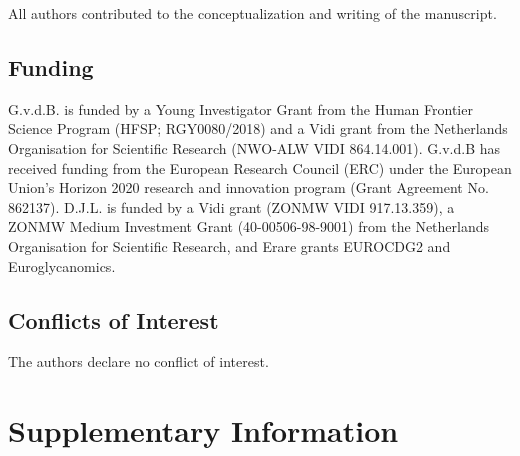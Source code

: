 All authors contributed to the conceptualization and writing of the manuscript.

\subsection{Funding}

G.v.d.B. is funded by a Young Investigator Grant from the Human Frontier Science Program (HFSP; RGY0080/2018) and a Vidi grant from the Netherlands Organisation for Scientific Research (NWO-ALW VIDI 864.14.001). G.v.d.B has received funding from the European Research Council (ERC) under the European Union’s Horizon 2020 research and innovation program (Grant Agreement No. 862137). D.J.L. is funded by a Vidi grant (ZONMW VIDI 917.13.359), a ZONMW Medium Investment Grant (40-00506-98-9001) from the Netherlands Organisation for Scientific Research, and Erare grants EUROCDG2 and Euroglycanomics.

\subsection{Conflicts of Interest}

The authors declare no conflict of interest.

\clearpage

\section{Supplementary Information}

